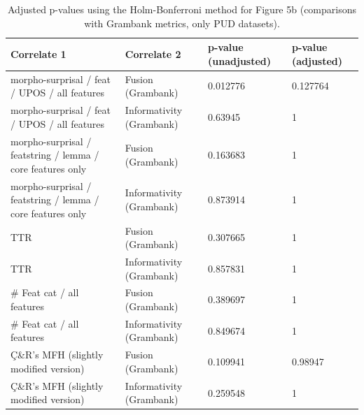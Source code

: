 \documentclass[USenglish]{article}
\begin{document}
\begin{table}[ht]
    \centering
    \caption{Adjusted p-values using the Holm-Bonferroni method \citep{holm_simple_1979} for Figure 5b
    (comparisons with Grambank metrics, only PUD datasets). } %
    \label{tab:p_values_adjusted_grambank_pud}   
   \begin{tabular}{p{3.1cm}p{3.1cm}p{2.4cm}p{2.4cm}}
\toprule
	\textbf{Correlate 1}	&	\textbf{Correlate 2}& \textbf{p-value \newline(unadjusted)}    &	\textbf{p-value \newline(adjusted)}	\\
    \midrule
morpho-surprisal /   feat /   UPOS /   all features	&	Fusion (Grambank)	&	0.012776	&0.127764 \\ \midrule
morpho-surprisal /   feat /   UPOS /   all features	&	Informativity (Grambank)	&	0.63945	&1
\\ \midrule
morpho-surprisal /   featstring  /    lemma /   core features only	&	Fusion (Grambank)	&	0.163683&	1\\ \midrule
morpho-surprisal /   featstring  /    lemma /   core features only	&	Informativity (Grambank)	&	0.873914&	1	\\ \midrule
TTR	&	Fusion (Grambank)	&	0.307665	&1	\\ \midrule
TTR	&	Informativity (Grambank)	&	0.857831&	1	\\ \midrule
\# Feat cat /   all features	&	Fusion (Grambank)	&	0.389697&	1	\\ \midrule
\# Feat cat /   all features	&	Informativity (Grambank)	&	0.849674 &	1
	\\ \midrule
Ç\&R's MFH (slightly modified version)	&	Fusion (Grambank)	&	0.109941	&0.98947
	\\ \midrule
Ç\&R's MFH (slightly modified version)	&	Informativity (Grambank)	&	0.259548 &	1
	\\ \bottomrule
\end{tabular}
\end{table}


\end{document}
